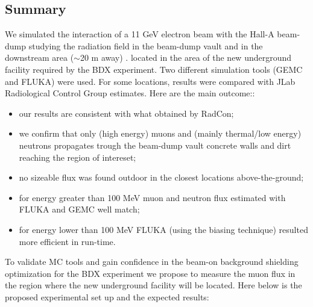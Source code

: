 \subsection{Summary}
We simulated the interaction of a 11 GeV electron beam with the Hall-A beam-dump studying the   radiation field in the beam-dump vault and in the downstream area ($\sim$20 m away) .
 located in the area of  the new underground  facility required by the BDX experiment. Two different  simulation tools (GEMC and FLUKA) were used. For some locations, results were compared with JLab Radiological Control Group estimates. 
Here are the main outcome::
\begin{itemize}
\item{our results are consistent with what obtained by RadCon;}
\item{we confirm that only (high energy) muons and (mainly  thermal/low energy) neutrons propagates trough the beam-dump vault concrete walls  and dirt reaching the region of intereset; }
\item{no sizeable flux was found outdoor in the closest locations above-the-ground;}
\item{for energy greater than 100 MeV muon and neutron flux estimated with FLUKA and GEMC well match;}
\item{for energy lower than 100 MeV  FLUKA (using the biasing technique)  resulted more efficient in run-time. }
\end{itemize}
To validate MC tools and gain confidence in the beam-on background shielding optimization  for the  BDX experiment we propose to measure the muon flux in the region where the new underground facility will be located. 
Here below is the proposed experimental set up and the expected results:
